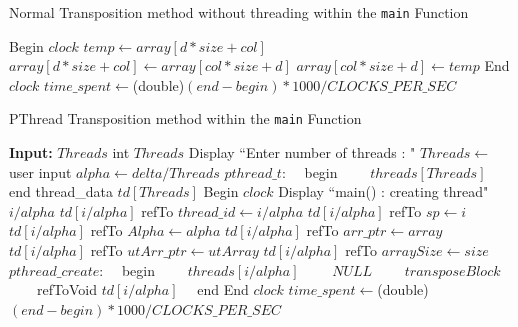 \documentclass[10pt, conference]{IEEEtran}
\def\code#1{\texttt{#1}}
\begin{document}
\begin{appendices}
\begin{algorithm}[h!]
\begin{algorithmic}
\end{algorithmic}
\end{algorithm}

\begin{algorithm}[h!]
\caption{Normal Transposition method without threading within the \code{main} Function}
\label{Normal Transposition}
\begin{algorithmic} 
	\STATE Begin $clock$
	\STATE
			\STATE $temp \leftarrow array[d*size + col]$
			\STATE $array[d*size + col] \leftarrow array[col*size + d]$
			\STATE $array[col*size + d] \leftarrow temp$
		\ENDFOR
	\ENDFOR
	\STATE
	\STATE End $clock$
	\STATE $time\_spent \leftarrow $(double)$(end-begin)*1000/CLOCKS\_PER\_SEC$
\ENDIF

\end{algorithmic}
\end{algorithm}

\begin{algorithm}[h!]
\caption{PThread Transposition method within the \code{main} Function}
\label{PThread Transposition}
\begin{algorithmic} 
\STATE \textbf{Input:} $Threads$
\STATE
{}
	\STATE
	\STATE int $Threads$
	\STATE Display ``Enter number of threads : "
	\STATE $Threads \leftarrow$ user input
	\STATE $alpha \leftarrow delta/Threads$
	\STATE $pthread\_t$:
		\STATE $\quad$begin
			\STATE $\qquad threads[Threads]$
		\STATE $\quad$end
	\STATE thread\_data $td[Threads]$
	\STATE
	\STATE Begin $clock$
	\STATE
		\STATE Display ``main() : creating thread" $i/alpha$
		\STATE
		\STATE $td[i/alpha]$ refTo $thread\_id \leftarrow i/alpha$
		\STATE $td[i/alpha]$ refTo $sp \leftarrow i$
		\STATE $td[i/alpha]$ refTo $Alpha \leftarrow alpha$
		\STATE $td[i/alpha]$ refTo $arr\_ptr \leftarrow array$
		\STATE $td[i/alpha]$ refTo $utArr\_ptr \leftarrow utArray$
		\STATE $td[i/alpha]$ refTo $arraySize \leftarrow size$
		\STATE $pthread\_create$:
			\STATE $\quad$begin
				\STATE $\qquad threads[i/alpha]$
				\STATE $\qquad NULL$
				\STATE $\qquad transposeBlock$
				\STATE $\qquad$refToVoid $td[i/alpha]$
			\STATE $\quad$end
	\ENDFOR
	\STATE
	\STATE End $clock$
	\STATE $time\_spent \leftarrow $(double)$(end-begin)*1000/CLOCKS\_PER\_SEC$
\ENDIF

\end{algorithmic}
\end{algorithm}


\end{appendices}
\end{document}
